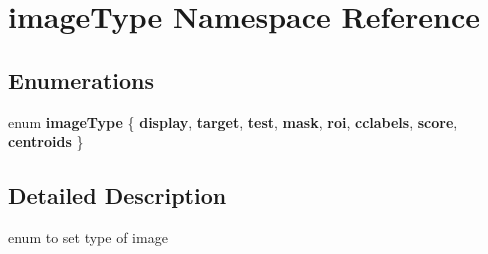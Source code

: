 \hypertarget{namespaceimage_type}{}\section{image\+Type Namespace Reference}
\label{namespaceimage_type}
\subsection*{Enumerations}
\begin{DoxyCompactItemize}
\item 
\mbox{\label{namespaceimage_type_a99984ff735c04c93abbe1c8557821068}} 
enum {\bfseries image\+Type} \{ \newline
{\bfseries display}, 
{\bfseries target}, 
{\bfseries test}, 
{\bfseries mask}, 
\newline
{\bfseries roi}, 
{\bfseries cclabels}, 
{\bfseries score}, 
{\bfseries centroids}
 \}
\end{DoxyCompactItemize}


\subsection{Detailed Description}
enum to set type of image 